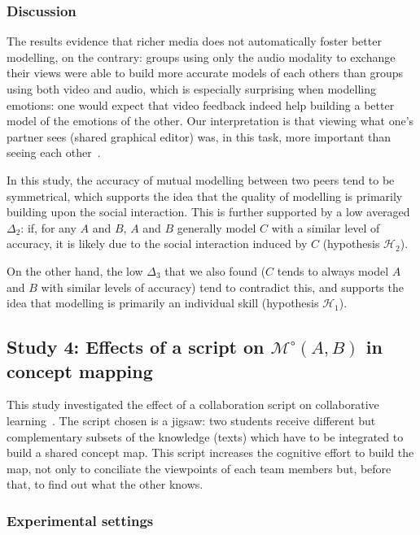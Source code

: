 \documentclass[natbib]{svjour3}
\newcommand{\gModel}[2]{{$\mathcal{M}^{\circ}(#1, #2)$}}
\begin{document}
\subsubsection*{Discussion}

The results evidence that richer media does not automatically foster better
modelling, on the contrary: groups using only the audio modality to exchange
their views were able to build more accurate models of each others than groups
using both video and audio, which is especially surprising when modelling
emotions: one would expect that video feedback indeed help building a better
model of the emotions of the other. Our interpretation is that viewing what
one's partner sees (shared graphical editor) was, in this task, more important
than seeing each other~\citep{gaver1993one,anderson1997impact}.

In this study, the accuracy of mutual modelling between two peers tend to be
symmetrical, which supports the idea that the quality of modelling is primarily
building upon the social interaction. This is further supported by a low
averaged $\Delta_2$: if, for any $A$ and $B$, $A$ and $B$ generally model $C$
with a similar level of accuracy, it is likely due to the social interaction
induced by $C$ (hypothesis $\mathcal{H}_{2}$).

On the other hand, the low $\Delta_3$ that we also found ($C$ tends to always
model $A$ and $B$ with similar levels of accuracy) tend to contradict this, and
supports the idea that modelling is primarily an individual skill (hypothesis
$\mathcal{H}_{1}$).


\subsection{{\bf Study 4}:  Effects of a script on \gModel{A}{B}  in concept mapping}

This study investigated the effect of a collaboration script on collaborative
learning~\citep{molinari2008effects}. The script chosen is a {\sc jigsaw}: two students
receive different but complementary subsets of the knowledge (texts) which have
to be integrated to build a shared concept map.  This script increases the
cognitive effort to build the map, not only to conciliate the viewpoints of
each team members but, before that, to find out what the other knows. 

\subsubsection*{Experimental settings}
\end{document}
